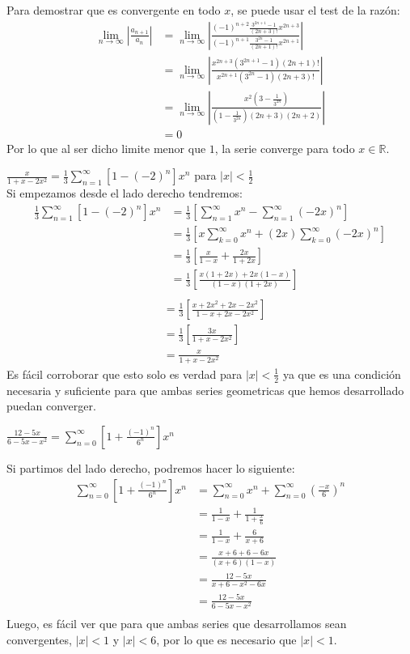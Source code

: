 \documentclass[../main.tex]{subfiles}
\begin{document}
Para demostrar que es convergente en todo $x$, se puede usar el test de la razón:
\begin{align*}
    \lim_{n \to \infty} \left|\frac{a_{n+1}}{a_n}\right| &= \lim_{n \to \infty} \left|\frac{(-1)^{n+2} \frac{3^{2n+1}-1}{(2n+3)!}x^{2n+3}}{(-1)^{n+1} \frac{3^{2n}-1}{(2n+1)!} x^{2n+1}}\right|\\
    &= \lim_{n \to \infty} \left|\frac{x^{2n+3} (3^{2n+1}-1) (2n+1)!}{x^{2n+1} (3^{2n}-1)(2n+3)!}\right|\\
    &= \lim_{n \to \infty} \left|\frac{x^2 (3- \frac{1}{3^{2n}})}{(1- \frac{1}{3^{2n}})(2n+3)(2n+2)}\right|\\
    &= 0
\end{align*}
Por lo que al ser dicho limite menor que $1$, la serie converge para todo $x \in \mathbb{R}$.

\question $\frac{x}{1+x-2x^2} = \frac{1}{3}\sum\limits_{n = 1}^\infty [1-(-2)^n]x^n$ para $|x| < \frac{1}{2}$\\

Si empezamos desde el lado derecho tendremos:
\begin{align*}
    \frac{1}{3}\sum\limits_{n = 1}^\infty [1-(-2)^n]x^n &= \frac{1}{3} \left[\sum_{n = 1}^\infty x^n - \sum_{n = 1}^\infty (-2x)^n\right]\\
    &= \frac{1}{3} \left[x\sum_{k = 0}^\infty x^n + (2x) \sum_{k = 0}^\infty (-2x)^n\right]\\
    &= \frac{1}{3} \left[\frac{x}{1-x} + \frac{2x}{1+2x}\right]\\
    &= \frac{1}{3} \left[\frac{x(1+2x) + 2x(1-x)}{(1-x)(1+2x)}\right]\\
\end{align*}
\begin{align*}
    &= \frac{1}{3} \left[\frac{x+2x^2+2x-2x^2}{1-x+2x-2x^2}\right]\\
    &= \frac{1}{3} \left[\frac{3x}{1+x-2x^2}\right]\\
    &= \frac{x}{1+x-2x^2}
\end{align*}
Es fácil corroborar que esto solo es verdad para $|x| < \frac{1}{2}$ ya que es una condición necesaria y suficiente para que ambas series geometricas que hemos desarrollado puedan converger.

\question $\frac{12-5x}{6-5x-x^2} = \sum\limits_{n=0}^\infty \left[1 + \frac{(-1)^n}{6^n}\right]x^n$

Si partimos del lado derecho, podremos hacer lo siguiente:
\begin{align*}
    \sum_{n=0}^\infty \left[1 + \frac{(-1)^n}{6^n}\right]x^n &= \sum_{n = 0}^\infty x^n + \sum_{n = 0}^\infty \left(\frac{-x}{6}\right)^n\\
    &= \frac{1}{1-x} + \frac{1}{1+\frac{x}{6}}\\
    &= \frac{1}{1-x} + \frac{6}{x+6}\\
    &= \frac{x+6 + 6 - 6x}{(x+6)(1-x)}\\
    &= \frac{12 - 5x}{x+6-x^2-6x}\\
    &= \frac{12 - 5x}{6-5x-x^2}\\
\end{align*}
Luego, es fácil ver que para que ambas series que desarrollamos sean convergentes, $|x| < 1$ y $|x| < 6$, por lo que es necesario que $|x| < 1$.
\end{document}
